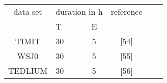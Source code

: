 \documentclass[convert={outext=.svg,command=\unexpanded{pdf2svg \infile\space\outfile}},multi=false,border={1cm 1cm 1cm 1cm}]{standalone}
\begin{document}
    \begin{tabularx}{.5\textwidth}{cXcccc}
        data set & \multicolumn{2}{c}{duration in h} & reference    \tabularnewline
        & T & E & \tabularnewline
        \midrule
        TIMIT & 30 & 5 & [54] \tabularnewline
        \midrule
        WSJ0 & 30 & 5 & [55] \tabularnewline
        \midrule
        TEDLIUM & 30 & 5 & [56] \tabularnewline
    \end{tabularx}
\end{document}
